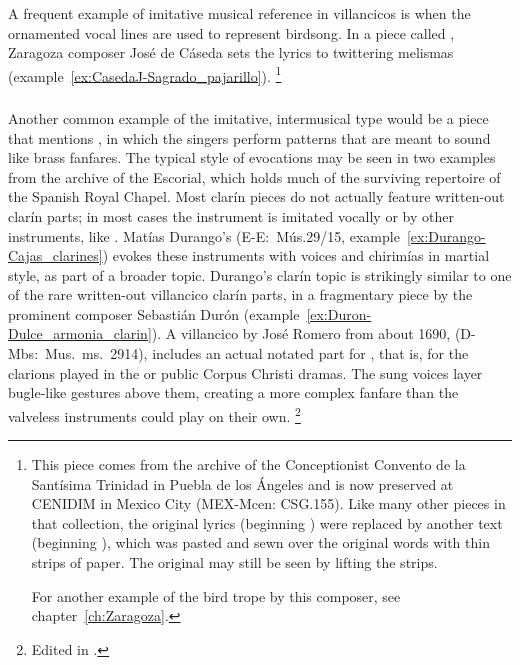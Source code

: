 A frequent example of imitative musical reference in villancicos is when the ornamented vocal lines are used to represent birdsong.
In a piece called  , Zaragoza composer José de Cáseda sets the lyrics   to twittering melismas (example~\ref{ex:CasedaJ-Sagrado_pajarillo}).%
	\footnote{%
This piece comes from the archive of the Conceptionist Convento de la Santísima Trinidad in Puebla de los Ángeles and is now preserved at CENIDIM in Mexico City (MEX-Mcen: CSG.155).
Like many other pieces in that collection, the original lyrics (beginning ) were replaced by another text (beginning ), which was pasted and sewn over the original words with thin strips of paper.
The original may still be seen by lifting the strips.

For another example of the bird trope by this composer, see chapter~\ref{ch:Zaragoza}.
	}
% 
% 
\subsubsection{}

Another common example of the imitative, intermusical type would be a piece that mentions  , in which the singers perform patterns that are meant to sound like brass fanfares.
The typical style of  evocations may be seen in two examples from the archive of the Escorial, which holds much of the surviving repertoire of the Spanish Royal Chapel.
Most clarín pieces do not actually feature written-out clarín parts; in most cases the instrument is imitated vocally or by other instruments, like .
Matías Durango's   (E-E:~Mús.29/15, example~\ref{ex:Durango-Cajas_clarines}) evokes these instruments with voices and chirimías in martial style, as part of a broader  topic.
Durango's clarín topic is strikingly similar to one of the rare written-out villancico clarín parts, in a fragmentary piece by the prominent composer Sebastián Durón (example~\ref{ex:Duron-Dulce_armonia_clarin}).
A villancico by José Romero from about 1690,   (D-Mbs:~Mus.~ms.~2914), includes an actual notated part for , that is, for the clarions played in the  or public Corpus Christi dramas. 
The sung voices layer bugle-like gestures above them, creating a more complex fanfare than the valveless instruments could play on their own.%
	\footnote{%
	Edited in \autocite[655--661]{CaberoPueyo:PhD}.
	}

